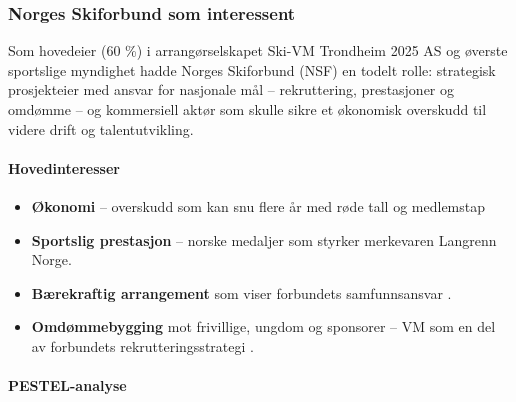 \subsubsection{Norges Skiforbund som interessent}

Som hovedeier (60 \%) i arrangørselskapet Ski-VM Trondheim 2025 AS og øverste sportslige myndighet hadde Norges Skiforbund (NSF) en todelt rolle: strategisk prosjekteier med ansvar for nasjonale mål -- rekruttering, prestasjoner og omdømme -- og kommersiell aktør som skulle sikre et økonomisk overskudd til videre drift og talentutvikling\cite{ProffSkiVM2025}.

\paragraph{Hovedinteresser}

\begin{itemize}
    \item \textbf{Økonomi} -- overskudd som kan snu flere år med røde tall og medlemstap\cite{Adresseavisen}
    \item \textbf{Sportslig prestasjon} -- norske medaljer som styrker merkevaren Langrenn Norge.
    \item \textbf{Bærekraftig arrangement} som viser forbundets samfunnsansvar \cite{TrondheimKommune}.
    \item \textbf{Omdømmebygging} mot frivillige, ungdom og sponsorer -- VM som en del av forbundets rekrutteringsstrategi \cite{OsloVM}.
\end{itemize}

\paragraph{PESTEL-analyse}

